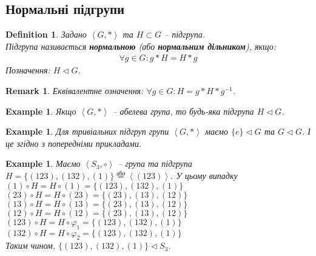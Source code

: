 \documentclass[a4paper, 10pt]{article}
\theoremstyle{theoremdd}
\theoremstyle{theoremdd}
\newtheorem{definition}[theorem]{Definition}
\theoremstyle{theoremdd}
\theoremstyle{theoremdd}
\theoremstyle{theoremdd}
\newtheorem{example}[theorem]{Example}
\theoremstyle{theoremdd}
\theoremstyle{theoremdd}
\theoremstyle{theoremdd}
\theoremstyle{theoremdd}
\theoremstyle{theoremdd}
\theoremstyle{theoremdd}
\newtheorem{remark}[theorem]{Remark}
\theoremstyle{theoremdd}
\theoremstyle{theoremdd}
\theoremstyle{theoremdd}
\theoremstyle{theoremdd}
\begin{document}
\subsection{Нормальні підгрупи}
\begin{definition}
Задано $\left<G,* \right>$ та $H \subset G$ -- підгрупа.\\
Підгрупа називається \textbf{нормальною} (або \textbf{нормальним дільником}), якщо:
\begin{align*}
\forall g \in G: g*H = H*g
\end{align*}
Позначення: $H \triangleleft G$.
\end{definition}

\begin{remark}
Еквівалентне означення: $\forall g \in G: H = g*H*g^{-1}$.
\end{remark}

\begin{example}
Якщо $\left<G,* \right>$ -- абелева група, то будь-яка підгрупа $H \triangleleft G$.
\end{example}

\begin{example}
Для тривіальних підгруп групи $\left<G,*\right>$ маємо $\{e\} \triangleleft G$ та $G \triangleleft G$. І це згідно з попередніми прикладами.
\end{example}

\begin{example}
Маємо $\left<S_3, \circ \right>$ -- група та підгрупа $H = \{(123),(132),(1)\} \overset{\text{або}}{=} \left<(123)\right>$. У цьому випадку\\
$(1) \circ H = H \circ (1) = \{(123),(132),(1)\}$\\
$(23) \circ H = H \circ (23) = \{(23),(13),(12)\} $\\
$(13) \circ H = H \circ (13) = \{(23),(13),(12)\} $\\
$(12) \circ H = H \circ (12) = \{(23),(13),(12)\} $\\
$(123) \circ H = H \circ \varphi_1 = \{(123),(132),(1)\}$\\
$(132) \circ H = H \circ \varphi_2 = \{(123),(132),(1)\}$\\
Таким чином, $\{(123),(132),(1)\} \triangleleft S_3$.
\end{example}

\iffalse
\begin{remark}
Довільна група може мати й нормальні, так й ненормальні (ору, ненормальні) підгрупи.
\end{remark}
\fi
\end{document}
